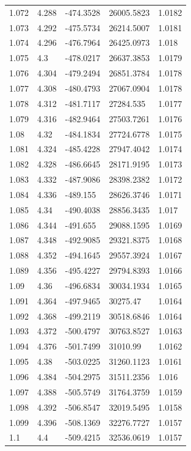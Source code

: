 \begin{tabular}{lllll}
1.072 & 4.288 & -474.3528 & 26005.5823 & 1.0182 \\
1.073 & 4.292 & -475.5734 & 26214.5007 & 1.0181 \\
1.074 & 4.296 & -476.7964 & 26425.0973 & 1.018 \\
1.075 & 4.3 & -478.0217 & 26637.3853 & 1.0179 \\
1.076 & 4.304 & -479.2494 & 26851.3784 & 1.0178 \\
1.077 & 4.308 & -480.4793 & 27067.0904 & 1.0178 \\
1.078 & 4.312 & -481.7117 & 27284.535 & 1.0177 \\
1.079 & 4.316 & -482.9464 & 27503.7261 & 1.0176 \\
1.08 & 4.32 & -484.1834 & 27724.6778 & 1.0175 \\
1.081 & 4.324 & -485.4228 & 27947.4042 & 1.0174 \\
1.082 & 4.328 & -486.6645 & 28171.9195 & 1.0173 \\
1.083 & 4.332 & -487.9086 & 28398.2382 & 1.0172 \\
1.084 & 4.336 & -489.155 & 28626.3746 & 1.0171 \\
1.085 & 4.34 & -490.4038 & 28856.3435 & 1.017 \\
1.086 & 4.344 & -491.655 & 29088.1595 & 1.0169 \\
1.087 & 4.348 & -492.9085 & 29321.8375 & 1.0168 \\
1.088 & 4.352 & -494.1645 & 29557.3924 & 1.0167 \\
1.089 & 4.356 & -495.4227 & 29794.8393 & 1.0166 \\
1.09 & 4.36 & -496.6834 & 30034.1934 & 1.0165 \\
1.091 & 4.364 & -497.9465 & 30275.47 & 1.0164 \\
1.092 & 4.368 & -499.2119 & 30518.6846 & 1.0164 \\
1.093 & 4.372 & -500.4797 & 30763.8527 & 1.0163 \\
1.094 & 4.376 & -501.7499 & 31010.99 & 1.0162 \\
1.095 & 4.38 & -503.0225 & 31260.1123 & 1.0161 \\
1.096 & 4.384 & -504.2975 & 31511.2356 & 1.016 \\
1.097 & 4.388 & -505.5749 & 31764.3759 & 1.0159 \\
1.098 & 4.392 & -506.8547 & 32019.5495 & 1.0158 \\
1.099 & 4.396 & -508.1369 & 32276.7727 & 1.0157 \\
1.1 & 4.4 & -509.4215 & 32536.0619 & 1.0157 \\

\end{tabular}
